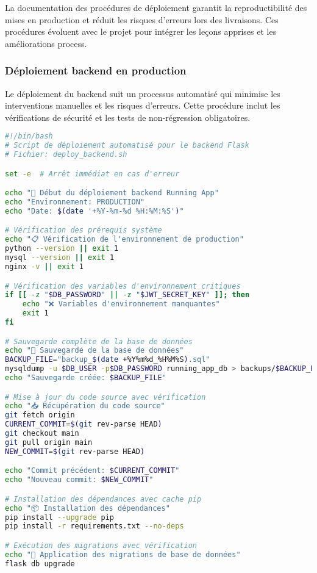 La documentation des procédures de déploiement garantit la reproductibilité des mises en production et réduit les risques d'erreurs lors des livraisons. Ces procédures évoluent avec le projet pour intégrer les leçons apprises et les améliorations process.

\subsubsection{Déploiement backend en production}

Le déploiement du backend suit un processus automatisé qui minimise les interventions manuelles et les risques d'erreurs. Cette procédure inclut les vérifications de sécurité et les tests de non-régression obligatoires.

\begin{lstlisting}[language=bash, caption=Script de déploiement backend production]
#!/bin/bash
# Script de déploiement automatisé pour le backend Flask
# Fichier: deploy_backend.sh

set -e  # Arrêt immédiat en cas d'erreur

echo "🚀 Début du déploiement backend Running App"
echo "Environnement: PRODUCTION"
echo "Date: $(date '+%Y-%m-%d %H:%M:%S')"

# Vérification des prérequis système
echo "📋 Vérification de l'environnement de production"
python --version || exit 1
mysql --version || exit 1
nginx -v || exit 1

# Vérification des variables d'environnement critiques
if [[ -z "$DB_PASSWORD" || -z "$JWT_SECRET_KEY" ]]; then
    echo "❌ Variables d'environnement manquantes"
    exit 1
fi

# Sauvegarde complète de la base de données
echo "💾 Sauvegarde de la base de données"
BACKUP_FILE="backup_$(date +%Y%m%d_%H%M%S).sql"
mysqldump -u $DB_USER -p$DB_PASSWORD running_app_db > backups/$BACKUP_FILE
echo "Sauvegarde créée: $BACKUP_FILE"

# Mise à jour du code source avec vérification
echo "📥 Récupération du code source"
git fetch origin
CURRENT_COMMIT=$(git rev-parse HEAD)
git checkout main
git pull origin main
NEW_COMMIT=$(git rev-parse HEAD)

echo "Commit précédent: $CURRENT_COMMIT"
echo "Nouveau commit: $NEW_COMMIT"

# Installation des dépendances avec cache pip
echo "📦 Installation des dépendances"
pip install --upgrade pip
pip install -r requirements.txt --no-deps

# Exécution des migrations avec vérification
echo "🔄 Application des migrations de base de données"
flask db upgrade


\end{lstlisting}
